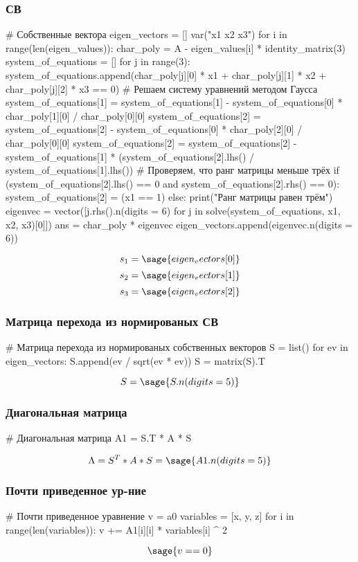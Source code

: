 \subsubsection{СВ}
\begin{sagesilent}
# Собственные вектора
eigen_vectors = []
var("x1 x2 x3")
for i in range(len(eigen_values)):
    char_poly = A - eigen_values[i] * identity_matrix(3)
    system_of_equations = []
    for j in range(3):
        system_of_equations.append(char_poly[j][0] * x1 + char_poly[j][1] * x2 + char_poly[j][2] * x3 == 0)
    # Решаем систему уравнений методом Гаусса
    system_of_equations[1] = system_of_equations[1] - system_of_equations[0] * char_poly[1][0] / char_poly[0][0]
    system_of_equations[2] = system_of_equations[2] - system_of_equations[0] * char_poly[2][0] / char_poly[0][0]
    system_of_equations[2] = system_of_equations[2] - system_of_equations[1] * (system_of_equations[2].lhs() / system_of_equations[1].lhs())
    # Проверяем, что ранг матрицы меньше трёх
    if (system_of_equations[2].lhs() == 0 and system_of_equations[2].rhs() == 0):
        system_of_equations[2] = (x1 == 1)
    else:
        print("Ранг матрицы равен трём")
    eigenvec = vector([j.rhs().n(digits = 6) for j in solve(system_of_equations, x1, x2, x3)[0]])
    ans = char_poly * eigenvec
    eigen_vectors.append(eigenvec.n(digits = 6))
\end{sagesilent}
$$s_1 = \sage{eigen_vectors[0]}$$
$$s_2 = \sage{eigen_vectors[1]}$$
$$s_3 = \sage{eigen_vectors[2]}$$


\subsubsection{Матрица перехода из нормированых СВ}
\begin{sagesilent}
# Матрица перехода из нормированых собственных векторов
S = list()
for ev in eigen_vectors:
    S.append(ev / sqrt(ev * ev))
S = matrix(S).T
\end{sagesilent}
$$S = \sage{S.n(digits = 5)}$$

\subsubsection{Диагональная матрица}
\begin{sagesilent}
# Диагональная матрица
A1 = S.T * A * S
\end{sagesilent}
$$\Lambda = S^T * A * S = \sage{A1.n(digits = 5)}$$

\subsubsection{Почти приведенное ур-ние}
\begin{sagesilent}
# Почти приведенное уравнение
v = a0
variables = [x, y, z]
for i in range(len(variables)):
    v += A1[i][i] * variables[i] ^ 2
\end{sagesilent}
$$\sage{v==0}$$


